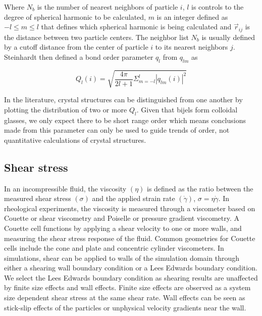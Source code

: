 Where $N_b$ is the number of nearest neighbors of particle $i$, $l$ is controls to the degree of spherical harmonic to be calculated, $m$ is an integer 
defined as $-l \leq m \leq l$ that defines which spherical harmonic is being calculated and $\vec{r}_{ij}$ is the distance between two particle centers. 
The neighbor list $N_b$ is usually defined by a cutoff distance from the center of particle $i$ to its nearest neighbors $j$. Steinhardt then defined a 
bond order parameter $q_l$ from $q_{lm}$ as

\begin{equation}
Q_{l}(i) = \sqrt{\frac{4 \pi}{2l + 1} \Sigma_{m = -l}^{l} |q_{lm}(i)|^2}
\end{equation}

In the literature, crystal structures can be distinguished from one another by plotting the distribution of two or more $Q_{l}$. 
\cite{lechner_accurate_2008, mickel_shortcomings_2013} Given that bijels form colloidal glasses, we only expect there to be
short range order which means conclusions made from this parameter can only be used to guide trends of order, not quantitative 
calculations of crystal structures.


\subsection{Shear stress}
\label{section:shear_viscosity}

In an incompressible fluid, the viscosity $(\eta)$ is defined as the ratio between the measured 
shear stress $(\sigma)$ and the applied strain rate $(\dot{\gamma})$, $\sigma = \eta \dot{\gamma}$. In rheological 
experiments, the viscosity is measured through a viscometer based on Couette or shear viscometry and Poiselle or 
pressure gradient viscometry. A Couette cell functions by applying a shear velocity to one or more walls, and measuring 
the shear stress response of the fluid. Common geometries for Couette cells include the cone and plate and concentric 
cylinder viscometers. In simulations, shear can be applied to walls of the simulation domain through either a shearing 
wall boundary condition or a Lees Edwards boundary condition. We select the Lees Edwards boundary condition as shearing 
results are unaffected by finite size effects and wall effects. Finite size effects are observed as a system size
dependent shear stress at the same shear rate. Wall effects can be seen as stick-slip effects of the particles or 
unphysical velocity gradients near the wall.

